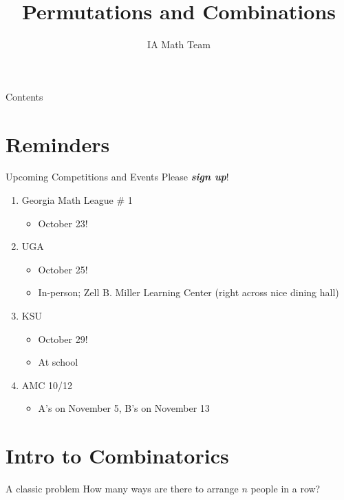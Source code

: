 \documentclass[aspectratio=169,xcolor=dvipsnames]{beamer}
\title[Permutations and Combinations]{Permutations and Combinations}
\author[IA Math Team]{IA Math Team}
\begin{document}
\begin{frame}[t]
  \titlepage
\end{frame}

\begin{frame}[t]{Contents}
  \tableofcontents
\end{frame}


\section{Reminders}

\begin{frame}[t]{Upcoming Competitions and Events}
    Please \textit{\textbf{sign up}}!
    \vspace{0.2cm}
    \begin{enumerate}
        \item Georgia Math League \# 1  %
        \begin{itemize}
            \item October 23!
        \end{itemize}
        \item UGA
        \begin{itemize}
            \item October 25!
            \item In-person; Zell B. Miller Learning Center (right across nice dining hall)
        \end{itemize}
        \item KSU
        \begin{itemize}
            \item October 29!
            \item At school
        \end{itemize}
        \item AMC 10/12
        \begin{itemize}
            \item A's on November 5, B's on November 13
        \end{itemize}
    \end{enumerate}
\end{frame}

\section{Intro to Combinatorics}

\begin{frame}[t]{A classic problem}
    How many ways are there to arrange $n$ people in a row?
\end{frame}
\end{document}

